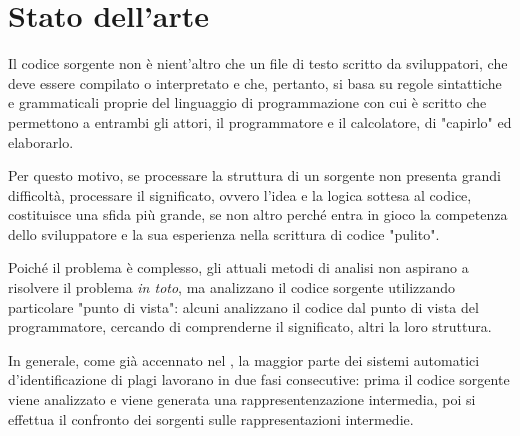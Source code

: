 
\section{Stato dell'arte}
Il codice sorgente non è nient'altro che un file di testo scritto da sviluppatori, che deve essere compilato o interpretato e che, pertanto, si basa su regole sintattiche e grammaticali proprie del linguaggio di programmazione con cui è scritto che permettono a entrambi gli attori, il programmatore e il calcolatore, di "capirlo" ed elaborarlo.

Per questo motivo, se processare la struttura di un sorgente non presenta grandi difficoltà, processare il significato, ovvero l'idea e la logica sottesa al codice, costituisce una sfida più grande, se non altro perché entra in gioco la competenza dello sviluppatore e la sua esperienza nella scrittura di codice "pulito".

Poiché il problema è complesso, gli attuali metodi di analisi non aspirano a risolvere il problema \textit{in toto}, ma analizzano il codice sorgente utilizzando particolare "punto di vista": alcuni analizzano il codice dal punto di vista del programmatore, cercando di comprenderne il significato, altri la loro struttura.





In generale, come già accennato nel , la maggior parte dei sistemi automatici d'identificazione di plagi lavorano in due fasi consecutive: prima il codice sorgente viene analizzato e viene generata una rappresentenzazione intermedia, poi si effettua il confronto dei sorgenti sulle rappresentazioni intermedie.

